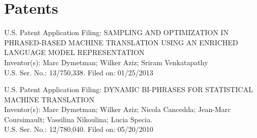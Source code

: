 

\section*{Patents}

\begin{description}
\item U.S. Patent Application Filing: SAMPLING AND OPTIMIZATION IN PHRASED-BASED MACHINE TRANSLATION USING AN ENRICHED LANGUAGE MODEL REPRESENTATION \\
Inventor(s): Marc Dymetman; Wilker Aziz; Sriram Venkatapathy \\
U.S. Ser. No.:  13/750,338. Filed on: 01/25/2013 
\end{description}

\begin{description}
\item U.S. Patent Application Filing: DYNAMIC BI-PHRASES FOR STATISTICAL MACHINE TRANSLATION  \\
Inventor(s): Marc Dymetman; Wilker Aziz; Nicola Cancedda; Jean-Marc Coursimault;  Vassilina Nikoulina; Lucia Specia. \\
U.S. Ser. No.:  12/780,040. Filed on: 05/20/2010  \\
\end{description}
